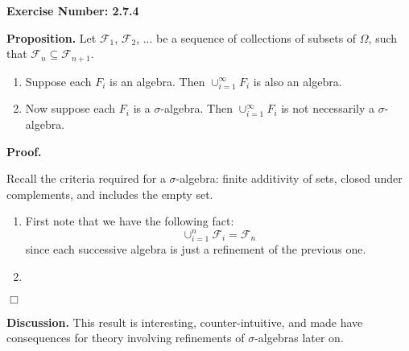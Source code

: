\documentclass{article}
\begin{document}
\noindent \textbf{Exercise Number: 2.7.4}  %

\medskip 

\noindent \textbf{Proposition.} Let $\mathcal{F}_1$, $\mathcal{F}_2$, ... be a sequence of collections of subsets of $\Omega$, such that $\mathcal{F}_n \subseteq \mathcal{F}_{n+1}$. 

\begin{enumerate}

\item Suppose each $F_i$ is an algebra. Then $\cup_{i=1}^\infty F_i$ is also an algebra.  

\item Now suppose each $F_i$ is a $\sigma$-algebra. Then $\cup_{i=1}^\infty F_i$ is not necessarily a $\sigma$-algebra. 

\end{enumerate}

\bigskip

\noindent \textbf{Proof.} 

\medskip

\noindent Recall the criteria required for a $\sigma$-algebra: finite additivity of sets, 
closed under complements, and includes the empty set. 

\begin{enumerate}

\item First note that we have the following fact: \[\cup_{i = 1}^n \mathcal{F}_i = \mathcal{F}_n \] since each successive algebra is just a refinement of the previous one. 

\item 

\end{enumerate} 

\hfill $\Box$

\bigskip

\noindent \textbf{Discussion.} This result is interesting, counter-intuitive, and made have
consequences for theory involving refinements of $\sigma$-algebras later on. 
\end{document}
